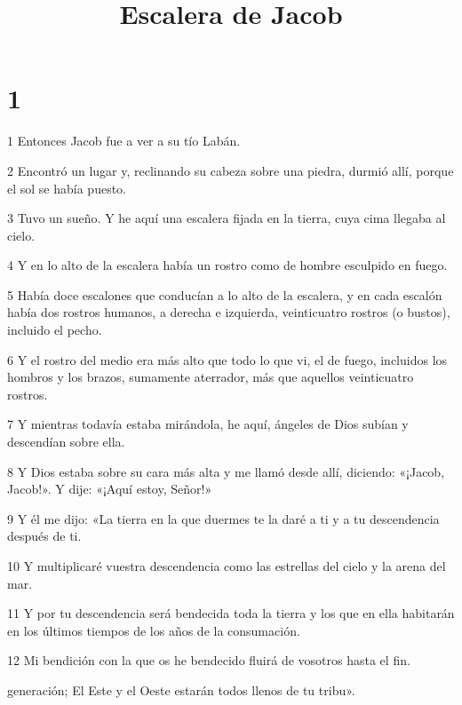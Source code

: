


\title{Escalera de Jacob}

\chapter{1}

\par 1 Entonces Jacob fue a ver a su tío Labán.

\par 2 Encontró un lugar y, reclinando su cabeza sobre una piedra, durmió allí, porque el sol se había puesto.

\par 3 Tuvo un sueño. Y he aquí una escalera fijada en la tierra, cuya cima llegaba al cielo.

\par 4 Y en lo alto de la escalera había un rostro como de hombre esculpido en fuego.

\par 5 Había doce escalones que conducían a lo alto de la escalera, y en cada escalón había dos rostros humanos, a derecha e izquierda, veinticuatro rostros (o bustos), incluido el pecho.

\par 6 Y el rostro del medio era más alto que todo lo que vi, el de fuego, incluidos los hombros y los brazos, sumamente aterrador, más que aquellos veinticuatro rostros.

\par 7 Y mientras todavía estaba mirándola, he aquí, ángeles de Dios subían y descendían sobre ella.

\par 8 Y Dios estaba sobre su cara más alta y me llamó desde allí, diciendo: «¡Jacob, Jacob!». Y dije: «¡Aquí estoy, Señor!»

\par 9 Y él me dijo: «La tierra en la que duermes te la daré a ti y a tu descendencia después de ti.

\par 10 Y multiplicaré vuestra descendencia como las estrellas del cielo y la arena del mar.

\par 11 Y por tu descendencia será bendecida toda la tierra y los que en ella habitarán en los últimos tiempos de los años de la consumación.

\par 12 Mi bendición con la que os he bendecido fluirá de vosotros hasta el fin.
\par generación; El Este y el Oeste estarán todos llenos de tu tribu».

